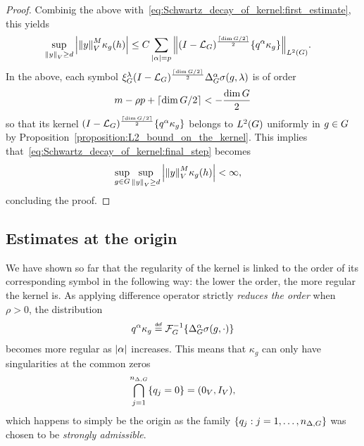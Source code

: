 \begin{proof}
    Combinig the above with~\eqref{eq:Schwartz_decay_of_kernel:first_estimate},
    this yields
    \begin{align}
        \sup_{\norm y \geq d} &\abs{\norm y^M \kappa_g(h)}
        \leq C \sum_{\abs \alpha = p} \norm [\Lebesgue 2 \Group] {\BesselPotential {\Ceiling {\dim \Group / 2}} \{q^\alpha \kappa_g\}}.
        \label{eq:Schwartz_decay_of_kernel:final_step}
    \end{align}
    In the above,
    each symbol $\xi^{\lambda}_{G} {(I - {\mathcal{L}_{G}})^\frac{\lceil\dim G / 2\rceil}{2}} {\Delta_{G}^{\alpha}} \sigma(g, \lambda)$ is of order
    \begin{align*}
        m - \rho p + \lceil\dim G / 2\rceil < -\frac {\dim G} 2
    \end{align*}
    so that its kernel ${(I - {\mathcal{L}_{G}})^\frac{\lceil\dim G / 2\rceil}{2}} \{q^\alpha \kappa_g\}$ belongs to ${L^{2} (G)}$ uniformly in $g \in G$ by Proposition~\ref{proposition:L2_bound_on_the_kernel}.
    This implies that~\eqref{eq:Schwartz_decay_of_kernel:final_step} becomes
    \begin{align*}
        \sup_{g \in G} \sup_{{\left\| y \right\|}_{V} \geq d} &\left|{{\left\| y \right\|}_{V}^M \kappa_g(h)}\right| < \infty,
    \end{align*}
    concluding the proof.
\end{proof}

\subsection{Estimates at the origin}

We have shown so far that the regularity of the kernel is linked to the order of its corresponding symbol in the following way:
the lower the order, the more regular the kernel is.
As applying difference operator strictly \emph{reduces the order} when $\rho > 0$,
the distribution
\begin{align*}
    q^\alpha \kappa_g \defeq \InverseFourier \{ \DifferenceOperatorOrder \alpha \sigma(g, \dummy) \}
\end{align*}
becomes more regular as $\left|{\alpha}\right|$ increases.
This means that $\kappa_g$ can only have singularities at the common zeros
\begin{align*}
    \bigcap_{j = 1}^{{n_{\Delta, G}}} \{ q_j = 0 \} = (0_V, {I_{V}}),
\end{align*}
which happens to simply be the origin
as the family $\{q_j : j = 1, \dots, {n_{\Delta, G}}\}$ was chosen to be \emph{strongly admissible}.

